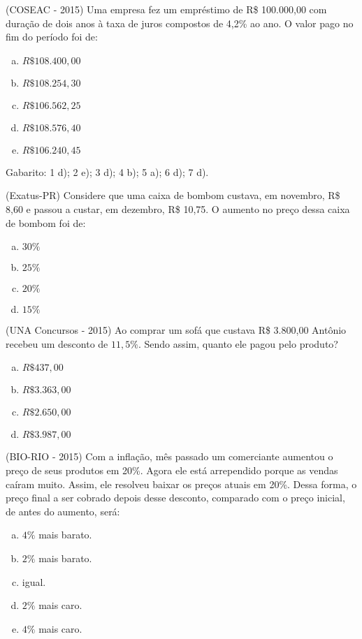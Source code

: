     \begin{exer}
  (COSEAC - 2015) Uma empresa fez um empréstimo de R\$ 100.000,00 com duração de dois anos à taxa de juros compostos de 4,2\% ao ano. O valor pago no fim do período foi de:
  \begin{enumerate}[a)]
  \item $R\$ 108.400,00$
  \item $R\$ 108.254,30$
  \item $R\$ 106.562,25$
  \item $R\$ 108.576,40$
  \item $R\$ 106.240,45$
  \end{enumerate}
 \end{exer}

 Gabarito: 1 d); 2 e); 3 d); 4 b); 5 a); 6 d); 7 d).
 

   \begin{exer}
  (Exatus-PR) Considere que uma caixa de bombom custava, em novembro, R\$ 8,60 e passou a custar, em dezembro, R\$ 10,75. O aumento no preço dessa caixa de bombom foi de:
  \begin{enumerate}[a)]
  \item $30\%$
  \item $25\%$
  \item $20\%$
  \item $15\%$
  \end{enumerate}
  \end{exer}

    \begin{exer}
  (UNA Concursos - 2015) Ao comprar um sofá que custava R\$ 3.800,00 Antônio recebeu um desconto de $11,5\%$. Sendo assim, quanto ele pagou pelo produto?
   \begin{enumerate}[a)]
  \item $R\$ 437,00$
  \item $R\$ 3.363,00$
  \item $R\$ 2.650,00$
  \item $R\$ 3.987,00$
  \end{enumerate}
  \end{exer}

 \begin{exer}
  (BIO-RIO - 2015) Com a inflação, mês passado um comerciante aumentou o preço de seus produtos em 20\%. Agora ele está arrependido porque as vendas caíram muito. Assim, ele resolveu baixar os preços atuais em 20\%. Dessa forma, o preço final a ser cobrado depois desse desconto, comparado com o preço inicial, de antes do aumento, será:
  \begin{enumerate}[a)]
  \item $4\%$ mais barato.
  \item $2\%$ mais barato.
  \item igual.
  \item $2\%$ mais caro.
  \item $4\%$ mais caro.
  \end{enumerate}
  \end{exer}

